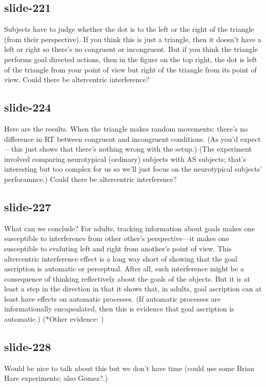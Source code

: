\documentclass[12pt,\papersize]{extarticle}
\begin{document}
 
\subsection{slide-221}
Subjects have to judge whether the dot is to the left or the right of the triangle (from their perspective).
If you think this is just a triangle, then it doesn't have a left or right so there's no congruent or incongruent.
But if you think the triangle performs goal directed actions, then in the figure on the top right, the dot is left of the triangle from your point of view but right of the triangle from its point of view.
Could there be altercentric interference?
 
 
\subsection{slide-224}
Here are the results.
When the triangle makes random movements: there's no difference in RT between congruent and incongruent conditions. (As you'd expect---this just shows that there's nothing wrong with the setup.)
(The experiment involved comparing neurotypical (ordinary) subjects with AS subjects; that's interesting but too complex for us so we'll just focus on the neurotypical subjects' perforamnce.)
Could there be altercentric interference?
 
 
\subsection{slide-227}
What can we conclude?
For adults, tracking information about goals makes one susceptible to interference from other other's perspective---it makes one susceptible to evaluting left and right from another's point of view.
This altercentric interference effect is a long way short of showing that the goal ascription is automatic or perceptual.
After all, such interference might be a consequence of thinking reflectively about the goals of the objects.
But it is at least a step in the direction in that it shows that, in adults, goal ascription can at least have effects on automatic processes.
(If automatic processes are informationally encapsulated, then this is evidence that goal ascription is automatic.)
(*Other evidence: \citep{Gao:2010,Teufel:2010})
 
 
\subsection{slide-228}
Would be nice to talk about this but we don't have time (could use some Brian Hare experiments; also Gomez?.)
 
\end{document}
